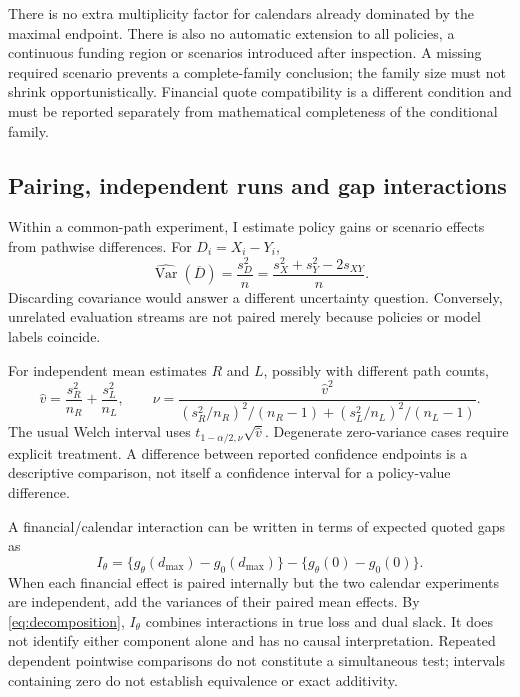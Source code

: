 There is no extra multiplicity factor for calendars already dominated by the maximal endpoint. There is also no automatic extension to all policies, a continuous funding region or scenarios introduced after inspection. A missing required scenario prevents a complete-family conclusion; the family size must not shrink opportunistically. Financial quote compatibility is a different condition and must be reported separately from mathematical completeness of the conditional family.

\subsection{Pairing, independent runs and gap interactions}

Within a common-path experiment, I estimate policy gains or scenario effects from pathwise differences. For $D_i=X_i-Y_i$,
\begin{equation}
 \widehat{\operatorname{Var}}(\overline D)=\frac{s_D^2}{n}
 =\frac{s_X^2+s_Y^2-2s_{XY}}{n}.
\label{eq:paired}
\end{equation}
Discarding covariance would answer a different uncertainty question. Conversely, unrelated evaluation streams are not paired merely because policies or model labels coincide.

For independent mean estimates $R$ and $L$, possibly with different path counts,
\begin{equation}
 \widehat v=\frac{s_R^2}{n_R}+\frac{s_L^2}{n_L},\qquad
 \nu=\frac{\widehat v^2}
 {(s_R^2/n_R)^2/(n_R-1)+(s_L^2/n_L)^2/(n_L-1)}.
\label{eq:welch}
\end{equation}
The usual Welch interval uses $t_{1-\alpha/2,\nu}\sqrt{\widehat v}$. Degenerate zero-variance cases require explicit treatment. A difference between reported confidence endpoints is a descriptive comparison, not itself a confidence interval for a policy-value difference.

A financial/calendar interaction can be written in terms of expected quoted gaps as
\begin{equation}
 I_\theta=\{g_\theta(d_{\max})-g_0(d_{\max})\}
          -\{g_\theta(0)-g_0(0)\}.
\label{eq:interaction}
\end{equation}
When each financial effect is paired internally but the two calendar experiments are independent, add the variances of their paired mean effects. By \eqref{eq:decomposition}, $I_\theta$ combines interactions in true loss and dual slack. It does not identify either component alone and has no causal interpretation. Repeated dependent pointwise comparisons do not constitute a simultaneous test; intervals containing zero do not establish equivalence or exact additivity.
